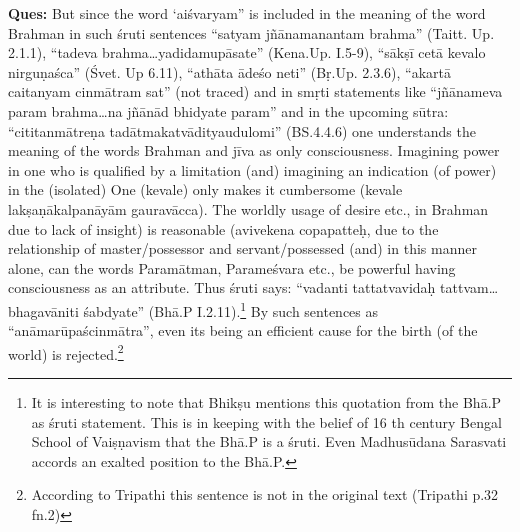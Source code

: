 \textbf{Ques:} But since the word ‘aiśvaryam” is included in the meaning of the word Brahman in such śruti sentences “satyam jñānamanantam brahma” (Taitt. Up. 2.1.1), “tadeva brahma…yadidamupāsate”  (Kena.\break Up. I.5-9), “sākṣī cetā kevalo nirguṇaśca” (Śvet. Up 6.11), “athāta ādeśo neti” (Bṛ.Up. 2.3.6), “akartā caitanyam cinmātram sat” (not traced) and in smṛti statements like “jñānameva param brahma…na jñānād bhidyate param” and in the upcoming sūtra: “cititanmātreṇa tadātmakatvādityaudulomi” (BS.4.4.6) one understands the meaning of the words Brahman and jīva as only consciousness. Imagining power in one who  is qualified by a limitation (and) imagining an indication (of power) in the (isolated) One (kevale) only makes it cumbersome (kevale lakṣaṇākalpanāyām gauravācca). The worldly usage of desire etc., in Brahman due to lack of insight) is reasonable (avivekena copapatteḥ, due to the relationship of master/possessor and servant/possessed (and) in this manner alone, can the words Paramātman, Parameśvara etc., be powerful having consciousness as an attribute. Thus śruti says: “vadanti tattatvavidaḥ tattvam…bhagavāniti śabdyate” (Bhā.P I.2.11).\footnote{It is interesting to note that Bhikṣu mentions this quotation from the Bhā.P as śruti statement. This is in keeping with the belief of 16 th century Bengal School of Vaiṣṇavism that the Bhā.P is a śruti. Even Madhusūdana Sarasvati accords an exalted position to the Bhā.P.} By such sentences as “anāmarūpaścinmātra”, even its being an efficient cause for the birth (of the world) is rejected.\footnote{According to Tripathi this sentence is not in the original text (Tripathi p.32 fn.2)} 


